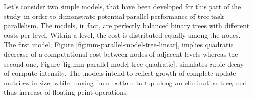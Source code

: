 Let's consider two simple models, that have been developed for this part of the study, in order to demonstrate potential parallel performance of tree-task parallelism. The models, in fact, are perfectly balanced binary trees with different costs per level. Within a level, the cost is distributed equally among the nodes. The first model, Figure \ref{fig:mm-parallel-model-tree-linear}, implies 
quadratic decrease of a computational cost between nodes of adjacent levels whereas the second one, Figure \ref{fig:mm-parallel-model-tree-quadratic}, simulates cubic decay of compute-intensity. The models intend to reflect growth of complete update matrices in size, while moving from bottom to top along an elimination tree, and thus increase of floating point operations.\\













